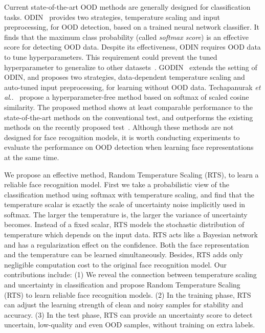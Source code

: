 \documentclass[letterpaper]{article} %
\makeatletter
\DeclareRobustCommand\onedot{\futurelet\@let@token\@onedot}
\def\@onedot{\ifx\@let@token.\else.\null\fi\xspace}
\def\etal{\emph{et al}\onedot}
\makeatother
\begin{document}
Current state-of-the-art OOD methods are generally designed for classification tasks. ODIN~\cite{liang2018enhancing} provides two strategies, temperature scaling and input preprocessing, for OOD detection, based on a trained neural network classifier. It finds that the maximum class probability (called \emph{softmax score}) is an effective score for detecting OOD data. Despite its effectiveness, ODIN requires OOD data to tune hyperparameters. This requirement could prevent the tuned hyperparameter to generalize to other datasets~\cite{shafaei2019less}.
%
GODIN~\cite{hsu2020generalized} extends the setting of ODIN, and proposes two strategies, data-dependent temperature scaling and auto-tuned input preprocessing, for learning without OOD data.
%
Techapanurak \etal~\cite{techapanurak2019hyperparameter} propose a hyperparameter-free method based on softmax of scaled cosine similarity. The proposed method shows at least comparable performance to the state-of-the-art methods on the conventional test, and outperforms the existing methods on the recently proposed test~\cite{shafaei2019less}.
%
Although these methods are not designed for face recognition models, it is worth conducting experiments to evaluate the performance on OOD detection when learning face representations at the same time.

We propose an effective method, Random Temperature Scaling (RTS), to learn a reliable face recognition model.
%
First we take a probabilistic view of the classification method using softmax with temperature scaling, and find that the temperature scalar is exactly the scale of uncertainty noise implicitly used in softmax. The larger the temperature is, the larger the variance of uncertainty becomes.
%
Instead of a fixed scalar, RTS models the stochastic distribution of temperature which depends on the input data. RTS acts like a Bayesian network~\cite{gal2016dropout,theobald2021bayesian} and has a regularization effect on the confidence.
%
Both the face representation and the temperature can be learned simultaneously. Besides, RTS adds only negligible computation cost to the original face recognition model.
%
Our contributions include:
%
(1) We reveal the connection between temperature scaling and uncertainty in classification and propose Random Temperature Scaling (RTS) to learn reliable face recognition models.
%
(2) In the training phase, RTS can adjust the learning strength of clean and noisy samples for stability and accuracy.
%
(3) In the test phase, RTS can provide an uncertainty score to detect uncertain, low-quality and even OOD samples, without training on extra labels.
\end{document}
